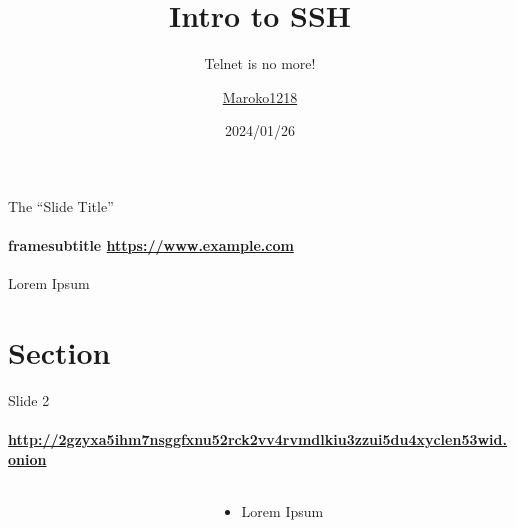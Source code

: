 \documentclass[xcolor=x11names,dvipsnames,aspectratio=169]{beamer}
\title{Intro to SSH}
\subtitle{Telnet is no more!}
\author{\href{https://markussvan.com/}{Maroko1218}}
\date{2024/01/26}
\begin{document}
	\frame{\titlepage}

\setcounter{showSlideNumbers}{0}

  \begin{frame}{The ``\alert{Slide Title}''}
    \framesubtitle{framesubtitle \url{https://www.example.com}}
    Lorem Ipsum
  \end{frame}

\section{Section}

\begin{frame}{Slide 2}
  \framesubtitle{\url{http://2gzyxa5ihm7nsggfxnu52rck2vv4rvmdlkiu3zzui5du4xyclen53wid.onion}}
  \begin{columns}
    \begin{column}{0.44\textwidth}
      \begin{center}
      \end{center}
    \end{column}
    \begin{column}{0.57\textwidth}
      \begin{itemize}
        \item Lorem Ipsum
      \end{itemize}
    \end{column}
  \end{columns}
\end{frame}

  \backmatter
\end{document}
